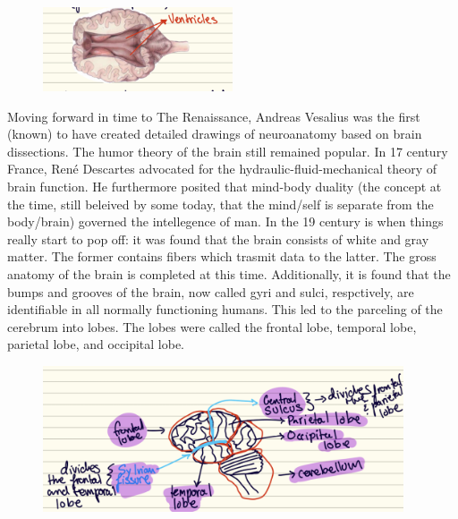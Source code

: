 \begin{figure}[H]
  \begin{center}
    \includegraphics[width=0.50\textwidth]{figures/ventricles.png}
  \end{center}
  \caption{}\label{fig:Ventricles}
\end{figure}

Moving forward in time to The Renaissance, Andreas Vesalius was the first (known) to have created detailed drawings of neuroanatomy based on brain dissections. The humor theory of the brain still remained popular. In 17 century France, Ren\'{e} Descartes advocated for the hydraulic-fluid-mechanical theory of brain function. He furthermore posited that mind-body duality (the concept at the time, still beleived by some today, that the mind/self is separate from the body/brain) governed the intellegence of man. In the 19 century is when things really start to pop off: it was found that the brain consists of white and gray matter. The former contains fibers which trasmit data to the latter. The gross anatomy of the brain is completed at this time. Additionally, it is found that the bumps and grooves of the brain, now called gyri and sulci, respctively, are identifiable in all normally functioning humans. This led to the parceling of the cerebrum into lobes.  The lobes were called the frontal lobe, temporal lobe, parietal lobe, and occipital lobe.

\begin{figure}[H]
  \begin{center}
    \includegraphics[width=0.95\textwidth]{figures/lobes.png}
  \end{center}
  \caption{}\label{fig:}
\end{figure}

